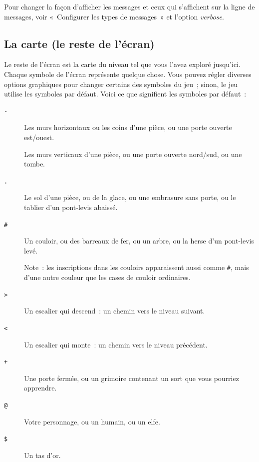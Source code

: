 \documentclass[titlepage]{article}
\begin{document}
Pour changer la façon d'afficher les messages et ceux qui s'affichent sur
la ligne de messages, voir «~Configurer les types de messages~» et
l'option
\textit{verbose}.

\subsection{La carte (le reste de l'écran)}



Le reste de l'écran est la carte du niveau tel que vous l'avez exploré
jusqu'ici.
Chaque symbole de l'écran représente quelque chose.
Vous pouvez régler diverses options graphiques pour changer certains des
symboles du jeu~; sinon, le jeu utilise les symboles par défaut.
Voici ce que signifient les symboles par défaut~:

\begin{description}
\item[{\texttt{-}}]
Les murs horizontaux ou les coins d'une pièce, ou une porte ouverte
est/ouest.

\item[{\texttt{\textbar{}}}]
Les murs verticaux d'une pièce, ou une porte ouverte nord/sud, ou une
tombe.

\item[{\texttt{.}}]
Le sol d'une pièce, ou de la glace, ou une embrasure sans porte, ou le
tablier d'un pont-levis abaissé.

\item[{\texttt{\#}}]
Un couloir, ou des barreaux de fer, ou un arbre, ou la herse d'un
pont-levis levé.


Note~: les inscriptions dans les couloirs apparaissent aussi comme
\texttt{\#}, mais d'une autre couleur que les cases de couloir ordinaires.

\item[{\texttt{\textgreater{}}}]
Un escalier qui descend~: un chemin vers le niveau suivant.

\item[{\texttt{\textless{}}}]
Un escalier qui monte~: un chemin vers le niveau précédent.

\item[{\texttt{+}}]
Une porte fermée, ou un grimoire contenant un sort que vous pourriez
apprendre.

\item[{\texttt{@}}]
Votre personnage, ou un humain, ou un elfe.

\item[{\texttt{\$}}]
Un tas d'or.


\end{description}
\end{document}
